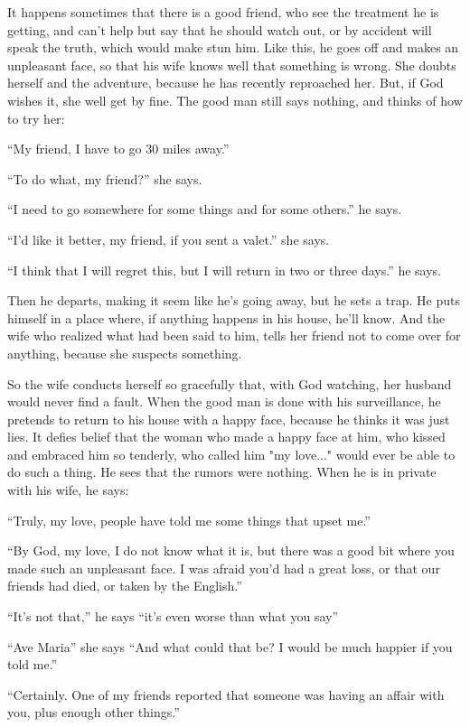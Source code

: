 \documentclass{book}
\begin{document}
It happens sometimes that there is a good friend, who see the treatment he is getting, and can't help but say that he should watch out, or by accident will speak the truth, which would make stun him. Like this, he goes off and makes an unpleasant face, so that his wife knows well that something is wrong. She doubts herself and the adventure, because he has recently reproached her. But, if God wishes it, she well get by fine. The good man still says nothing, and thinks of how to try her:

``My friend, I have to go 30 miles away.''

``To do what, my friend?'' she says.

``I need to go somewhere for some things and for some others.'' he says. 

``I'd like it better, my friend, if you sent a valet.'' she says.

``I think that I will regret this, but I will return in two or three days.'' he says.

Then he departs, making it seem like he's going away, but he sets a trap. He puts himself in a place where, if anything happens in his house, he'll know. And the wife who realized what had been said to him, tells her friend not to come over for anything, because she suspects something.

So the wife conducts herself so gracefully that, with God watching, her husband would never find a fault. When the good man is done with his surveillance, he pretends to return to his house with a happy face, because he thinks it was just lies. It defies belief that the woman who made a happy face at him, who kissed and embraced him so tenderly, who called him "my love..." would ever be able to do such a thing. He sees that the rumors were nothing. When he is in private with his wife, he says:

``Truly, my love, people have told me some things that upset me.''

``By God, my love, I do not know what it is, but there was a good bit where you made such an unpleasant face. I was afraid you'd had a great loss, or that our friends had died, or taken by the English.''

``It's not that,'' he says ``it's even worse than what you say''

``Ave Maria'' she says ``And what could that be? I would be much happier if you told me.''

``Certainly. One of my friends reported that someone was having an affair with you, plus enough other things.''
\end{document}
